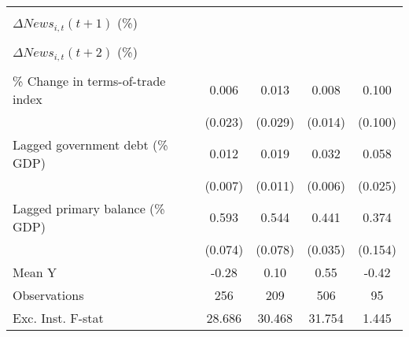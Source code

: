 {\begin{tabular}{l*{4}{c}}
                    &                     &                     &                     &                     \\
\addlinespace
$ \Delta News_{i,t}(t+1)$ (\%)&                     &                     &                     &                     \\
                    &                     &                     &                     &                     \\
\addlinespace
$ \Delta News_{i,t}(t+2)$ (\%)&                     &                     &                     &                     \\
                    &                     &                     &                     &                     \\
\addlinespace
\% Change in terms-of-trade index&       0.006         &       0.013         &       0.008         &       0.100         \\
                    &     (0.023)         &     (0.029)         &     (0.014)         &     (0.100)         \\
\addlinespace
Lagged government debt (\% GDP)&       0.012         &       0.019\sym{*}  &       0.032\sym{***}&       0.058\sym{**} \\
                    &     (0.007)         &     (0.011)         &     (0.006)         &     (0.025)         \\
\addlinespace
Lagged primary balance (\% GDP)&       0.593\sym{***}&       0.544\sym{***}&       0.441\sym{***}&       0.374\sym{**} \\
                    &     (0.074)         &     (0.078)         &     (0.035)         &     (0.154)         \\
\midrule
Mean Y              &       -0.28         &        0.10         &        0.55         &       -0.42         \\
Observations        &         256         &         209         &         506         &          95         \\
Exc. Inst. F-stat   &      28.686         &      30.468         &      31.754         &       1.445         \\
\bottomrule
\end{tabular}
}
